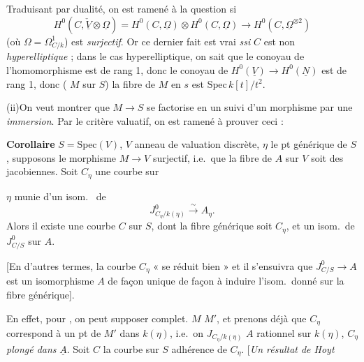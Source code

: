 \documentclass[11pt,a4paper]{article}
\begin{document}
Traduisant par dualité, on est ramené à la question si
\[
  H^{0}(C, \check{\underline{V}} \otimes \underline{\Omega})
  = H^{0}(C, \underline{\Omega}) \otimes H^{0}(C, \underline{\Omega})
  \longrightarrow H^{0}(C, \underline{\Omega}^{\otimes 2})
\]
(où $\Omega = \Omega^{1}_{C/k}$) est \emph{surjectif}. Or ce dernier fait est
vrai \emph{ssi} $C$ est non \emph{hyperelliptique} ; dans le cas
 hyperelliptique, on sait que le conoyau de l'homomorphisme
\ill{} \ill{} est de rang 1, donc le conoyau de $H^{0}(\underline{V}) \to
H^{0}(\underline{N})$ est de rang 1, donc (\ill{} \ill{} \ill{} $M$
\struck{\ill{}} \ill{} sur $S$) la fibre de $M$ en $s$ est
$\mathrm{Spec}\, k[t]/t^{2}$.

(ii)\quad On veut montrer que $M \to S$ se factorise en un \ill{} suivi d'un
morphisme \ill{} par une \emph{immersion}. Par le critère valuatif, on est
ramené à prouver ceci :

\textbf{Corollaire}\quad {} $S = \mathrm{Spec}(V)$, $V$ anneau
de valuation discrète,  $\eta$ le pt générique de $S$,
\struck{\ill{}} supposons le morphisme $M \to V$ surjectif, i.e.\ que la fibre
de $A$ sur $V$ soit des jacobiennes.  Soit $C_{\eta}$ une courbe
sur



$\eta$ munie d'un isom.\  de
\[
  J^{0}_{C_{\eta}/k(\eta)} \xrightarrow{\;\sim\;} A_{\eta}.
\]
Alors il existe une courbe $C$ sur $S$, 
dont la fibre générique soit $C_{\eta}$, et un isom.\ de $J^{0}_{C/S}$ sur
$A$.

[En d'autres termes, la courbe $C_{\eta}$ « se réduit bien » et il s'ensuivra
que $J^{0}_{C/S} \to A$ est un isomorphisme \ill{} $A$ de façon unique de
façon à induire l'isom.\ donné sur la fibre générique].



 En effet, pour \ill{} \ill{} \ill{}, on peut supposer
 \ill{}
complet. \ill{} $M$ \ill{} $M'$, et prenons \ill{} déjà que $C_{\eta}$
correspond à un pt de $M'$ dans $k(\eta)$, i.e.\ on \ill{}
$J_{C_{\eta}/k(\eta)}$ \ill{} \ill{} \ill{} $A$ rationnel sur $k(\eta)$, \ill{}
\ill{} $C_{\eta}$ \emph{plongé dans} $\underline{A}$. Soit $C$ la courbe sur
$S$ adhérence de $C_{\eta}$. [\emph{Un résultat de Hoyt}
\end{document}
